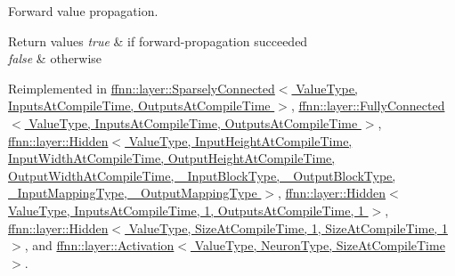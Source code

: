 Forward value propagation. 


\begin{DoxyRetVals}{Return values}
{\em true} & if forward-\/propagation succeeded \\
\hline
{\em false} & otherwise \\
\hline
\end{DoxyRetVals}


Reimplemented in \hyperlink{classffnn_1_1layer_1_1_sparsely_connected_a53f1d9a2edfdd2e47164b24121c23acc}{ffnn\-::layer\-::\-Sparsely\-Connected$<$ Value\-Type, Inputs\-At\-Compile\-Time, Outputs\-At\-Compile\-Time $>$}, \hyperlink{classffnn_1_1layer_1_1_fully_connected_ac49087ab2d66019f2d0244c76987fa50}{ffnn\-::layer\-::\-Fully\-Connected$<$ Value\-Type, Inputs\-At\-Compile\-Time, Outputs\-At\-Compile\-Time $>$}, \hyperlink{classffnn_1_1layer_1_1_hidden_aed780b7869487b020c839e5a3ce1d8e6}{ffnn\-::layer\-::\-Hidden$<$ Value\-Type, Input\-Height\-At\-Compile\-Time, Input\-Width\-At\-Compile\-Time, Output\-Height\-At\-Compile\-Time, Output\-Width\-At\-Compile\-Time, \-\_\-\-Input\-Block\-Type, \-\_\-\-Output\-Block\-Type, \-\_\-\-Input\-Mapping\-Type, \-\_\-\-Output\-Mapping\-Type $>$}, \hyperlink{classffnn_1_1layer_1_1_hidden_aed780b7869487b020c839e5a3ce1d8e6}{ffnn\-::layer\-::\-Hidden$<$ Value\-Type, Inputs\-At\-Compile\-Time, 1, Outputs\-At\-Compile\-Time, 1 $>$}, \hyperlink{classffnn_1_1layer_1_1_hidden_aed780b7869487b020c839e5a3ce1d8e6}{ffnn\-::layer\-::\-Hidden$<$ Value\-Type, Size\-At\-Compile\-Time, 1, Size\-At\-Compile\-Time, 1 $>$}, and \hyperlink{classffnn_1_1layer_1_1_activation_aa7f88c8bc20589dc51d9dd615b8c4580}{ffnn\-::layer\-::\-Activation$<$ Value\-Type, Neuron\-Type, Size\-At\-Compile\-Time $>$}.

